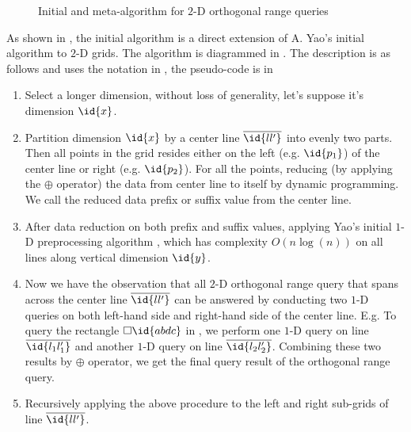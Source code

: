 
\begin{figure*}[!ht]
\centering
{}
\hfill
\caption{Initial and meta-algorithm for $2$-D orthogonal range queries}
\label{fig:twod}
\end{figure*}

As shown in , the initial algorithm is a direct extension
of A. Yao's initial algorithm \cite{Yao82} to $2$-D grids. The algorithm
is diagrammed in . The description is as follows and uses
the notation in , the pseudo-code is in 

\begin{enumerate}
\item Select a longer dimension, without loss of generality, let's
  suppose it's dimension $\id{x}$.
\item Partition dimension $\id{x}$ by a center line $\overline{\id{ll'}}$
  into evenly two parts. Then all points in the grid resides
  either on the left (e.g.  $\id{p_1}$) of the center line or right
  (e.g. $\id{p_2}$). For all the points, reducing (by applying the $\oplus$
  operator) the data from center line to itself by dynamic programming.
  We call the reduced data prefix or suffix value from the center line.
\item After data reduction on both prefix and suffix values, applying Yao's
  initial $1$-D preprocessing algorithm \cite{Yao82, ChazelleRo91},
  which has complexity $O(n \log (n))$ on all lines along vertical
  dimension $\id{y}$.
\item Now we have the observation that all $2$-D orthogonal range query
  that spans across the center line $\overline{\id{ll'}}$ can be
  answered by conducting two $1$-D queries on both left-hand side
  and right-hand side of the center line. E.g. To query the rectangle
  $\Box\id{abdc}$ in , we perform one $1$-D query
  on line $\overline{\id{l_1l_1'}}$ and another $1$-D query on line
  $\overline{\id{l_2l_2'}}$. Combining these two results by $\oplus$
  operator, we get the final query result of the orthogonal range query.
\item Recursively applying the above procedure to the left and right
  sub-grids of line $\overline{\id{ll'}}$.
\end{enumerate}

